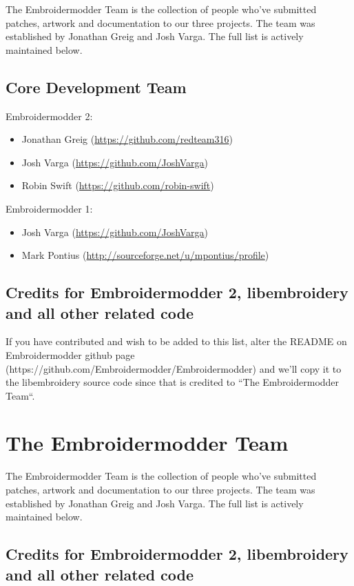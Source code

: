 \documentclass[10pt]{report}
\begin{document}
The Embroidermodder Team is the collection of people who've submitted
patches, artwork and documentation to our three projects.
The team was established by Jonathan Greig and Josh Varga.
The full list is actively maintained below.

\subsection{Core Development Team}

Embroidermodder 2:

\begin{itemize}
\item Jonathan Greig (\url{https://github.com/redteam316})
\item Josh Varga (\url{https://github.com/JoshVarga})
\item Robin Swift (\url{https://github.com/robin-swift})
\end{itemize}

Embroidermodder 1:

\begin{itemize}
\item Josh Varga (\url{https://github.com/JoshVarga})
\item Mark Pontius (\url{http://sourceforge.net/u/mpontius/profile})
\end{itemize}

\subsection{Credits for Embroidermodder 2, libembroidery and all other related code}

If you have contributed and wish to be added to this list, alter the  README on Embroidermodder
github page (https://github.com/Embroidermodder/Embroidermodder) and we'll copy it to the
libembroidery source code since that is credited to ``The Embroidermodder Team``.

\section{The Embroidermodder Team}

The Embroidermodder Team is the collection of people who've submitted
patches, artwork and documentation to our three projects.
The team was established by Jonathan Greig and Josh Varga.
The full list is actively maintained below.

\subsection{Credits for Embroidermodder 2, libembroidery and all other related code}
\label{credits-for-embroidermodder-2-libembroidery-and-all-other-related-code}
\end{document}
